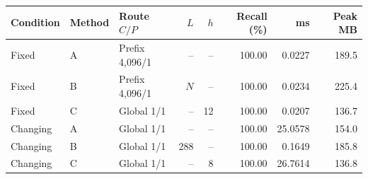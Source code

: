 \begin{tabular}{@{}lllrrrrr@{}}
\toprule
Condition & Method & Route $C/P$ & $L$ & $h$ & Recall (\%) & ms & Peak MB \\
\midrule
Fixed & A & Prefix 4,096/1 & -- & -- & 100.00 & 0.0227 & 189.5 \\
Fixed & B & Prefix 4,096/1 & $N$ & -- & 100.00 & 0.0234 & 225.4 \\
Fixed & C & Global 1/1 & -- & 12 & 100.00 & 0.0207 & 136.7 \\
Changing & A & Global 1/1 & -- & -- & 100.00 & 25.0578 & 154.0 \\
Changing & B & Global 1/1 & 288 & -- & 100.00 & 0.1649 & 185.8 \\
Changing & C & Global 1/1 & -- & 8 & 100.00 & 26.7614 & 136.8 \\
\bottomrule
\end{tabular}
